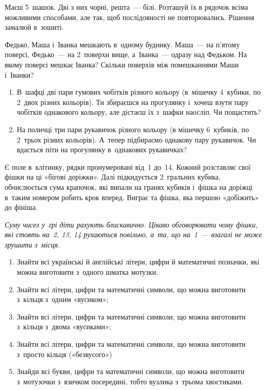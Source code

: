 \problem
Маєш 5~шашок. Дві з них чорні, решта~--- білі.
Розташуй їх в рядочок всіма можливими способами, але так,
щоб послідовності не повторювались.
Рішення замалюй в~зошиті.


\problem
Федько, Маша і~Іванка мешкають в~одному будинку.
Маша~--- на п’ятому поверсі, Федько~--- на 2~поверхи вище,
а~Іванка~--- одразу над Федьком.
На якому поверсі мешкає Іванка?
Скільки поверхів між помешканнями Маши і~Іванки?


\problem
{}
\begin{enumerate}
    \item В~шафці дві пари гумових чобітків різного кольору
    (в~мішечку 4~кубики, по 2~двох різних кольорів).
    Ти збираєшся на прогулянку і~хочеш взути пару чобітків однакового кольору,
    але дістаєш їх з~шафки наосліп. Чи пощастить?
    \item На поличці три пари рукавичок різного кольору
    (в мішечку 6~кубиків, по 2~трьох різних кольорів).
    А~тепер підбираємо однакову пару рукавичок.
    Чи вдасться піти на прогулянку в~однакових рукавичках?
\end{enumerate}


\problem
{}
Є поле в~клітинку, рядки пронумеровані від~1 до~14.
Кожний розставляє свої фішки на ці «бігові доріжки».
Далі підкидується 2~гральних кубика, обчислюється сума крапочок,
які випали на гранях кубиків і~фішка на доріжці в~таким номером
робить крок вперед.
Виграє та фішка, яка першою «добіжить» до фініша.

\emph{
Суму чисел у~грі діти рахують блискавично.
Цікаво обговорювати чому фішки, які стоять на~2, 13, 14 рухаються повільно,
а~та, що на~1~--- взагалі не може зрушити з~місця.
}


\problem
{}
\begin{enumerate}
    \item Знайти всі українські й англійські літери, цифри
    й математичні позначки, які можна виготовити з~одного шматка мотузки.
    \item Знайти всі літери, цифри та математичні символи,
    що можна виготовити з~кільця з~одним «вусиком»;
    \item Знайти всі літери, цифри та математичні символи,
    що можна виготовити з~кільця з~двома «вусиками»;
    \item Знайти всі літери, цифри та математичні символи,
    що можна виготовити з~просто кільця («безвусого»)
    \item Знайди всі букви, цифри та математичні символи,
    що можна виготовити з~мотузочки з~язичком посередині,
    тобто вузлика з~трьома хвостиками.
\end{enumerate}

